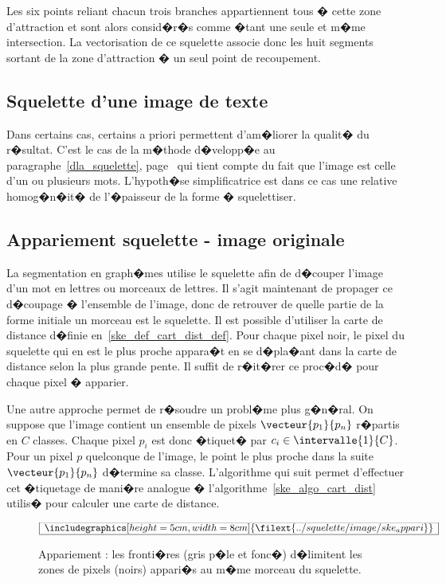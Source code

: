 Les six points reliant chacun trois branches appartiennent tous � cette zone d'attraction et sont alors consid�r�s comme �tant une seule et m�me intersection. La vectorisation de ce squelette associe donc les huit segments sortant de la zone d'attraction � un seul point de recoupement.


\subsection{Squelette d'une image de texte}

Dans certains cas, certains a priori permettent d'am�liorer la qualit� du r�sultat. C'est le cas de la m�thode d�velopp�e au paragraphe~\ref{dla_squelette}, page~\pageref{dla_squelette} qui tient compte du fait que l'image est celle d'un ou plusieurs mots. L'hypoth�se simplificatrice est dans ce cas une relative homog�n�it� de l'�paisseur de la forme � squelettiser.





\subsection{Appariement squelette - image originale}


La segmentation en graph�mes utilise le squelette afin de d�couper l'image d'un mot en lettres ou morceaux de lettres. Il s'agit maintenant de propager ce d�coupage � l'ensemble de l'image, donc de retrouver de quelle partie de la forme initiale un morceau est le squelette. Il est possible d'utiliser la carte de distance d�finie en~\ref{ske_def_cart_dist_def}. Pour chaque pixel noir, le pixel du squelette qui en est le plus proche appara�t en se d�pla�ant dans la carte de distance selon la plus grande pente. Il suffit de r�it�rer ce proc�d� pour chaque pixel � apparier.

Une autre approche permet de r�soudre un probl�me plus g�n�ral. On suppose que l'image contient un ensemble de pixels $\vecteur{p_1}{p_n}$ r�partis en $C$ classes. Chaque pixel $p_i$ est donc �tiquet� par $c_i \in \intervalle{1}{C}$. Pour un pixel $p$ quelconque de l'image, le point le plus proche dans la suite $\vecteur{p_1}{p_n}$ d�termine sa classe. L'algorithme qui suit permet d'effectuer cet �tiquetage de mani�re analogue � l'algorithme~\ref{ske_algo_cart_dist} utilis� pour calculer une carte de distance.

            \begin{figure}[ht]
        $$\frame{$\begin{array}[c]{c}\includegraphics[height=5cm, width=8cm]
        {\filext{../squelette/image/ske_appari}}\end{array}$}$$
        \caption{    Appariement : les fronti�res (gris p�le et fonc�) d�limitent 
                            les zones de pixels (noirs) appari�s au m�me morceau du squelette. }
        \label{squelette_appariement}
            \end{figure}



